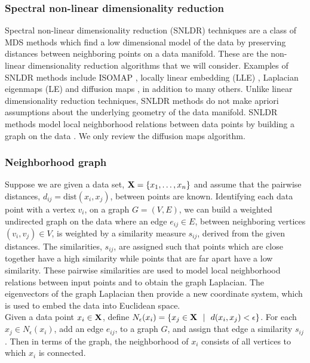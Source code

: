    
 \subsubsection{Spectral non-linear dimensionality reduction}
Spectral non-linear dimensionality reduction (SNLDR) techniques are a 
class of MDS methods which find a low dimensional model of the data by preserving distances between neighboring points on a data manifold. These are the non-linear dimensionality
reduction algorithms that we will consider. Examples of SNLDR methods include ISOMAP \cite{TenenbaumJB2000Aggf}, locally linear embedding (LLE)  \cite{roweis2000nonlinear}, Laplacian eigenmaps (LE) \cite{belkin2003laplacian} and diffusion maps \cite{coifman2006diffusion}, in addition to many others. Unlike linear dimensionality reduction techniques, SNLDR methods do not make apriori assumptions about the underlying geometry of the data manifold.
SNLDR methods model local neighborhood relations between data points by building a graph on the data  \cite{Luxburg2007}. We only review the diffusion maps algorithm.


\subsubsection{Neighborhood graph}
Suppose we are given a data set, $\textbf{X} =  \{x_{1}, \ldots, x_{n} \}$ and assume that the pairwise distances, $d_{ij} = \text{dist}(x_{i}, x_{j})$, between points are known. Identifying each data point with a vertex $v_{i}$, on a graph $G = (V, E)$, we can build a weighted  undirected graph on the data where an edge $e_{ij} \in E$, between neighboring vertices $(v_i, v_j) \in V$, is weighted by a similarity measure $s_{ij}$, derived from the given distances.
The similarities, $s_{ij}$, are assigned such that points which are close together have a high similarity while points that are far apart have a low similarity. These pairwise similarities are used to model local neighborhood relations between input points and to obtain the graph Laplacian.
The eigenvectors of the graph Laplacian then provide a new coordinate system, which is used to embed the data into Euclidean space.\\


Given a data point $x_i \in \textbf{X}$, define $N_{\epsilon}(x_i) = \{x_j \in \Bm{X} \ \ | \ \ d(x_i, x_j) < \epsilon \}$. For each $x_j \in N_{\epsilon}(x_i)$, add an edge $e_{ij}$, to a graph $G$,
and assign that edge a similarity $s_{ij}$. Then in terms of the graph, the neighborhood
of $x_i$ consists of all vertices to which $x_i$ is connected.\\ 

